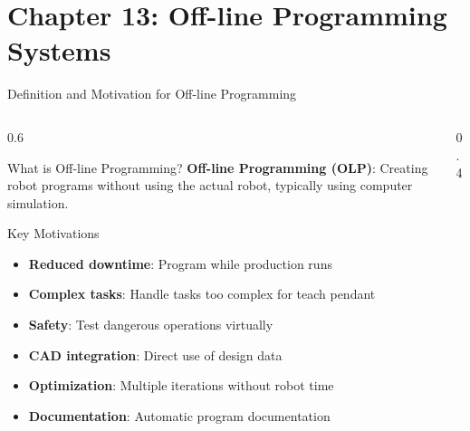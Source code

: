 \documentclass[10pt,aspectratio=169]{beamer}
\begin{document}
\section{Chapter 13: Off-line Programming Systems}

\begin{frame}{Definition and Motivation for Off-line Programming}
\begin{columns}[T]
\begin{column}{0.6\textwidth}
\begin{block}{What is Off-line Programming?}
\textbf{Off-line Programming (OLP)}: Creating robot programs without using the actual robot, typically using computer simulation.
\end{block}
\begin{alertblock}{Key Motivations}
\begin{itemize}
\item \textbf{Reduced downtime}: Program while production runs
\item \textbf{Complex tasks}: Handle tasks too complex for teach pendant
\item \textbf{Safety}: Test dangerous operations virtually
\item \textbf{CAD integration}: Direct use of design data
\item \textbf{Optimization}: Multiple iterations without robot time
\item \textbf{Documentation}: Automatic program documentation
\end{itemize}
\end{alertblock}
\end{column}
\begin{column}{0.4\textwidth}
\begin{center}
\end{center}
\end{column}
\end{columns}
\end{frame}
\end{document}
